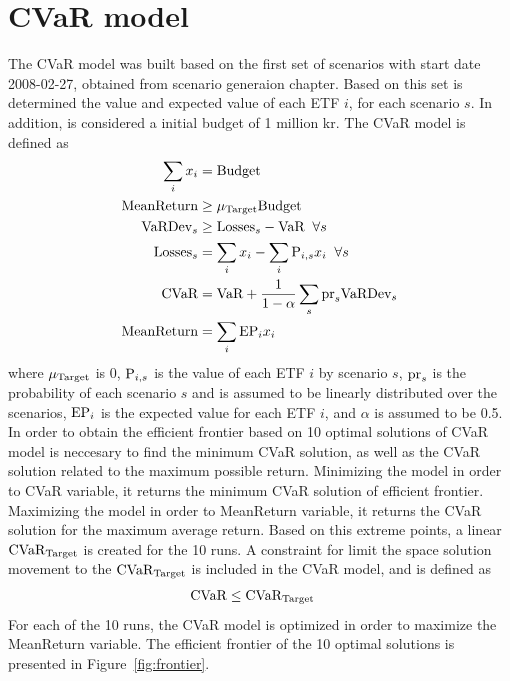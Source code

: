 \section{CVaR model}\label{sec:CVaR}

The CVaR model was built based on the first set of scenarios with start date 2008-02-27, obtained from scenario generaion chapter. 
Based on this set is determined the value and expected value of each ETF $i$, for each scenario $s$. In addition, is considered a initial budget of 1 million kr. 
The CVaR model is defined as
\begin{align}
\sum_{i} x_{i} &= \textup{Budget} \\
\textup{MeanReturn} &\ge \mu_{\textup{Target}} \textup{Budget} \\
\textup{VaRDev}_{s} &\ge \textup{Losses}_{s} - \textup{VaR} \; \; \forall s \\
\textup{Losses}_{s} &= \sum_{i} x_{i} - \sum_{i} \textup{P}_{i,s} x_{i} \; \; \forall s \\
\textup{CVaR} &= \textup{VaR} + \frac{1} {1 - \alpha} \sum_{s} \textup{pr}_{s} \textup{VaRDev}_{s} \\
\textup{MeanReturn} &= \sum_{i} \textup{EP}_{i} x_{i}
\end{align}
where $ \mu_{\textup{Target}}$ is 0, $\textup{P}_{i,s}$ is the value of each ETF $i$ by scenario $s$, $\textup{pr}_{s}$ is the probability of each scenario $s$ and is assumed to be linearly distributed over the scenarios, $\textup{EP}_{i}$ is the expected value for each ETF $i$, and $\alpha$ is assumed to be 0.5.
In order to obtain the efficient frontier based on 10 optimal solutions of CVaR model is neccesary to find the minimum CVaR solution, as well as the CVaR solution related to the maximum possible return. 
Minimizing the model in order to CVaR variable, it returns the minimum CVaR solution of efficient frontier. 
Maximizing the model in order to MeanReturn variable, it returns the CVaR solution for the maximum average return. Based on this extreme points, a linear $\textup{CVaR}_{\textup{Target}}$ is created for the 10 runs. 
A constraint for limit the space solution movement to the $\textup{CVaR}_{\textup{Target}}$ is included in the CVaR model, and is defined as
\begin{align}
\textup{CVaR} &\le \textup{CVaR}_{\textup{Target}} 
\end{align}
For each of the 10 runs, the CVaR model is optimized in order to maximize the MeanReturn variable. 
The efficient frontier of the 10 optimal solutions is presented in Figure~\ref{fig:frontier}. 

